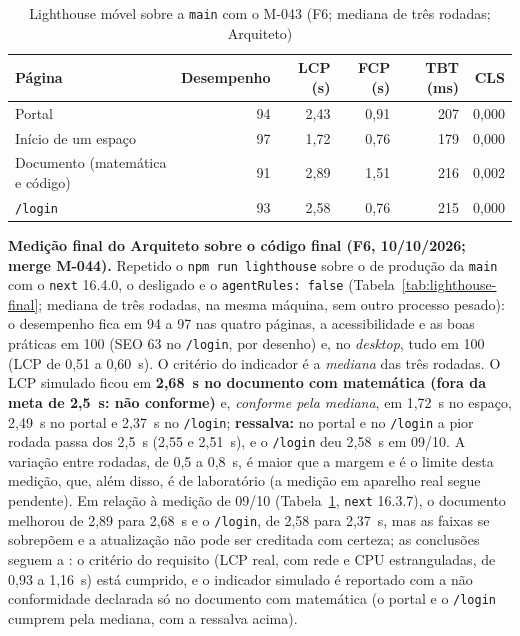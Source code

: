 \begin{table}[htbp]
\centering
\small
\caption{Lighthouse móvel sobre a \texttt{main} com o M-043 (F6; mediana de três rodadas; Arquiteto)}\label{tab:lighthouse-f6}
\begin{tabular}{@{}lrrrrr@{}}
\toprule
\textbf{Página} & \textbf{Desempenho} & \textbf{LCP (s)} & \textbf{FCP (s)} & \textbf{TBT (ms)} & \textbf{CLS}\\
\midrule
Portal & 94 & 2,43 & 0,91 & 207 & 0,000\\
Início de um espaço & 97 & 1,72 & 0,76 & 179 & 0,000\\
Documento (matemática e código) & 91 & 2,89 & 1,51 & 216 & 0,002\\
\texttt{/login} & 93 & 2,58 & 0,76 & 215 & 0,000\\
\bottomrule
\end{tabular}
\end{table}

\textbf{Medição final do Arquiteto sobre o código final (F6, 10/10/2026; merge M-044).} Repetido o \texttt{npm run lighthouse} sobre o  de produção da \texttt{main} com o \texttt{next} 16.4.0, o  desligado e o \texttt{agentRules: false} (Tabela~\ref{tab:lighthouse-final}; mediana de três rodadas, na mesma máquina, sem outro processo pesado): o desempenho fica em 94 a 97 nas quatro páginas, a acessibilidade e as boas práticas em 100 (SEO 63 no \texttt{/login}, por desenho) e, no \emph{desktop}, tudo em 100 (LCP de 0,51 a 0,60~s). O critério do indicador é a \emph{mediana} das três rodadas. O LCP simulado ficou em \textbf{2,68~s no documento com matemática (fora da meta de 2,5~s: não conforme)} e, \emph{conforme pela mediana}, em 1,72~s no espaço, 2,49~s no portal e 2,37~s no \texttt{/login}; \textbf{ressalva:} no portal e no \texttt{/login} a pior rodada passa dos 2,5~s (2,55 e 2,51~s), e o \texttt{/login} deu 2,58~s em 09/10. A variação entre rodadas, de 0,5 a 0,8~s, é maior que a margem e é o limite desta medição, que, além disso, é de laboratório (a medição em aparelho real segue pendente). Em relação à medição de 09/10 (Tabela~\ref{tab:lighthouse-f6}, \texttt{next} 16.3.7), o documento melhorou de 2,89 para 2,68~s e o \texttt{/login}, de 2,58 para 2,37~s, mas as faixas se sobrepõem e a atualização não pode ser creditada com certeza; as conclusões seguem a : o critério do requisito (LCP real, com rede e CPU estranguladas, de 0,93 a 1,16~s) está cumprido, e o indicador simulado é reportado com a não conformidade declarada só no documento com matemática (o portal e o \texttt{/login} cumprem pela mediana, com a ressalva acima).

